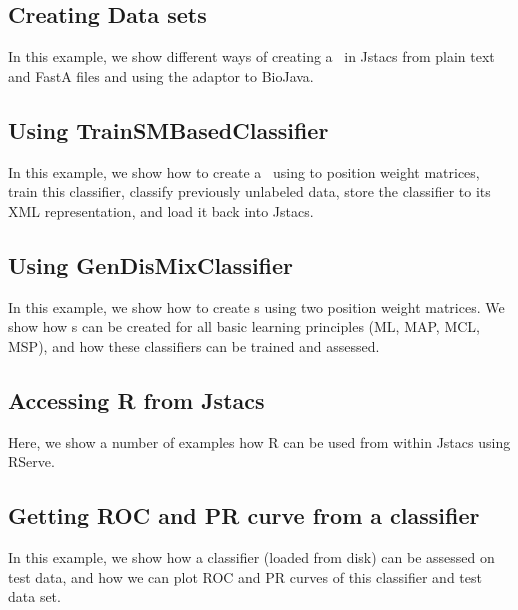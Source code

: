 \subsection{Creating Data sets}
In this example, we show different ways of creating a \DataSet~in Jstacs from plain text and FastA files and using the adaptor to BioJava.
\renewcommand{\codefile}{./recipes/DataLoader.java}
\setcounter{off}{47}

\subsection{Using TrainSMBasedClassifier}
In this example, we show how to create a \TrainSMBasedClassifier~using to position weight matrices, train this classifier, classify previously unlabeled data, store the classifier to its XML representation, and load it back into Jstacs.
\renewcommand{\codefile}{./recipes/TrainSMBasedClassifierTest.java}
\setcounter{off}{53}

\subsection{Using GenDisMixClassifier}
In this example, we show how to create \GenDisMixClassifier s using two position weight matrices. We show how \GenDisMixClassifier s can be created for all basic learning principles (ML, MAP, MCL, MSP), and how these classifiers can be trained and assessed.
\renewcommand{\codefile}{./recipes/GenDisMixClassifierTest.java}
\setcounter{off}{54}

\subsection{Accessing R from Jstacs}
Here, we show a number of examples how R can be used from within Jstacs using RServe.
\renewcommand{\codefile}{./recipes/RserveTest.java}
\setcounter{off}{40}

\subsection{Getting ROC and PR curve from a classifier}
In this example, we show how a classifier (loaded from disk) can be assessed on test data, and how we can plot ROC and PR curves of this classifier and test data set.
\renewcommand{\codefile}{./recipes/CurvePlotter.java}
\setcounter{off}{53}

